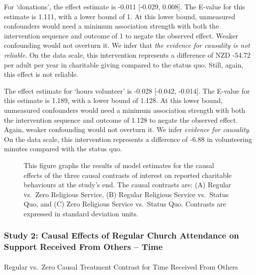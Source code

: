 \documentclass[
  single column]{article}
\makeatletter
\let\oldparagraph\paragraph
\renewcommand{\paragraph}{
    \@ifstar
      \xxxParagraphStar
      \xxxParagraphNoStar
  }
\newcommand{\xxxParagraphStar}[1]{\oldparagraph*{#1}\mbox{}}
\newcommand{\xxxParagraphNoStar}[1]{\oldparagraph{#1}\mbox{}}
\makeatother
\begin{document}
For `donations', the effect estimate is -0.011 {[}-0.029, 0.008{]}. The
E-value for this estimate is 1.111, with a lower bound of 1. At this
lower bound, unmeasured confounders would need a minimum association
strength with both the intervention sequence and outcome of 1 to negate
the observed effect. Weaker confounding would not overturn it. We infer
that \emph{the evidence for causality is not reliable}. On the data
scale, this intervention represents a difference of NZD -54.72 per adult
per year in charitable giving compared to the status quo. Still, again,
this effect is not reliable.

The effect estimate for `hours volunteer' is -0.028 {[}-0.042,
-0.014{]}. The E-value for this estimate is 1.189, with a lower bound of
1.128. At this lower bound, unmeasured confounders would need a minimum
association strength with both the intervention sequence and outcome of
1.128 to negate the observed effect. Again, weaker confounding would not
overturn it. We infer \emph{evidence for causality}. On the data scale,
this intervention represents a difference of -6.88 in volunteering
minutes compared with the status quo.

\begin{figure}


\caption{\label{fig-1_1}This figure graphs the results of model
estimates for the causal effects of the three causal contrasts of
interest on reported charitable behaviours at the study's end. The
causal contrasts are: (A) Regular vs.~Zero Religious Service, (B)
Regular Religious Service vs.~Status Quo, and (C) Zero Religious Service
vs.~Status Quo. Contrasts are expressed in standard deviation units.}

\end{figure}%

\newpage{}

\subsubsection{Study 2: Causal Effects of Regular Church Attendance on
Support Received From Others --
Time}\label{study-2-causal-effects-of-regular-church-attendance-on-support-received-from-others-time}

\paragraph{Regular vs.~Zero Causal Treatment Contrast for Time Received
From
Others}\label{regular-vs.-zero-causal-treatment-contrast-for-time-received-from-others}
\end{document}
